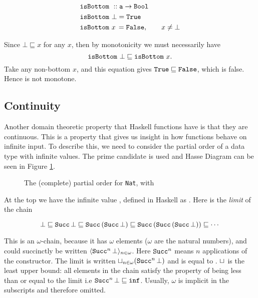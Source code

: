 \begin{align*}
& \hs{isBottom} \w :: \hs{a} \rightarrow \hs{Bool} \\
& \hs{isBottom} \w \bot = \hs{True} \\
& \hs{isBottom} \w x \, = \hs{False}, \qquad x \neq \bot
\end{align*}

\noindent
Since $\bot \sqsubseteq x$ for any $x$, then by monotonicity we must
necessarily have
$$\hs{isBottom} \w \bot \sqsubseteq \hs{isBottom} \w x.$$
Take any non-bottom $x$, and this equation gives
$\hs{True} \sqsubseteq \hs{False}$, which is false. Hence
 is not monotone.

\subsection{Continuity}
Another domain theoretic property that Haskell functions have is that
they are continuous. This is a property that gives us insight in how
functions behave on infinite input.  To describe this, we need to
consider the partial order of a data type with infinite values. The
prime candidate  is used and Hasse
Diagram can be seen in Figure \ref{fig:natcpo}.

\begin{figure}[h]
\centering

\caption{
    The (complete) partial order for \texttt{Nat}, with 
    \label{fig:natcpo}
}
\end{figure}

At the top we have the infinite value , defined in Haskell as
. Here  is the \emph{limit} of the chain

\begin{equation*}
\bot \sqsubseteq
\hs{Succ} \, \bot \sqsubseteq
\hs{Succ} \, (\hs{Succ} \, \bot) \sqsubseteq
\hs{Succ} \, (\hs{Succ} \, (\hs{Succ} \, \bot)) \sqsubseteq
\cdots
\end{equation*}

This is an $\omega$-chain, because it has $\omega$ elements ($\omega$
are the natural numbers), and could succinctly be written
$\langle \hs{Succ}^n \, \bot \rangle_{n \in \omega}$.
Here $\hs{Succ}^n$ means
$n$ applications of the  constructor. The limit is written
$\lub{n \in \omega} (\hs{Succ}^n \, \bot)$ and is equal to .
$\sqcup_{}$ is the least upper bound: all elements in the chain satisfy
the property of being less than or equal to the limit i.e
$\hs{Succ}^n \, \bot \sqsubseteq \hs{inf}$.
Usually, $\omega$ is implicit in the subscripts and therefore omitted.


